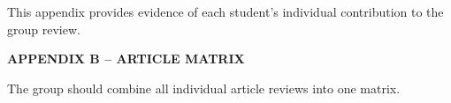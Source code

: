 \documentclass[12pt,a4paper]{article}
\begin{document}
This appendix provides evidence of each student's individual contribution to the group review.




\newpage

{}

\begin{flushleft}
    {\fontsize{14pt}{17pt}\selectfont
    \textbf{APPENDIX B -- ARTICLE MATRIX}}
\end{flushleft}

\vspace{0.5cm}

The group should combine all individual article reviews into one matrix.


\vspace{0.5cm}








\begin{table}[H]

\caption{Group article matrix of reviewed research studies}
\label{tab:article-matrix}

\fontsize{10pt}{12pt}\selectfont


\end{table}
\end{document}
